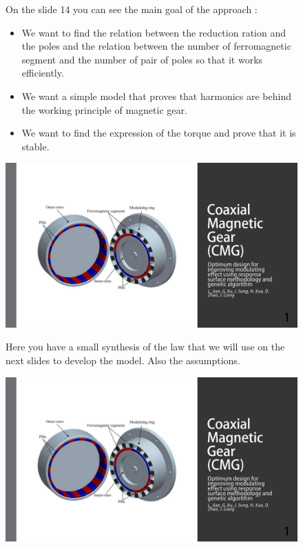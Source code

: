 \begin{figure}[H]
    \begin{minipage}{.45\linewidth}
        \centering
         On the slide 14 you can see the main goal of the approach :
         \begin{itemize}
             \item We want to find the relation between the reduction ration and the poles and the relation between the number of ferromagnetic segment and the number of pair of poles so that it works efficiently.
             \item We want a simple model that proves that harmonics are behind the working principle of magnetic gear.
             \item We want to find the expression of the torque and prove that it is stable.
         \end{itemize}
    \end{minipage}
    \hfill%
    \begin{minipage}[c]{.45\linewidth}
        \centering
        \includegraphics[page={13},width=\textwidth]{LELEC2311.allow.pdf}
    \end{minipage}
\end{figure}

\begin{figure}[H]
    \begin{minipage}{.45\linewidth}
        Here you have a small synthesis of the law that we will use on the next slides to develop the model. Also the assumptions.
    \end{minipage}
    \hfill%
    \begin{minipage}[c]{.45\linewidth}
        \centering
        \includegraphics[page={14},width=\textwidth]{LELEC2311.allow.pdf}
    \end{minipage}
\end{figure}


